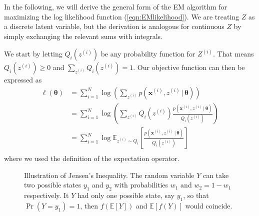 \documentclass[final,3p,times,twocolumn]{elsarticle}
\let\bs\boldsymbol
\begin{document}
In the following, we will derive the general form of the EM algorithm for maximizing the log likelihood function (\ref{eqn:EMlikelihood}).
We are treating $Z$ as a discrete latent variable, but the derivation is analogous for continuous $Z$ by simply exchanging the relevant sums with integrals.

We start by letting $Q_i(z^{(i)})$ be any probability function for $Z^{(i)}$. 
That means $Q_i(z^{(i)}) \geq 0$ and $\sum_{z^{(i)}} Q_i(z^{(i)}) = 1$. 
Our objective function can then be expressed as
\begin{equation}
\begin{split}
\ell(\bs\theta) &= \sum_{i=1}^N \log\left(\sum_{z^{(i)}} p(\bs x^{(i)},z^{(i)}\,|\,\bs\theta)\right)\\
&= \sum_{i=1}^N \log \left(\sum_{z^{(i)}} Q_i(z^{(i)}) \frac{p(\bs x^{(i)},z^{(i)}\,|\,\bs\theta)}{Q_i(z^{(i)})}\right)\\
&= \sum_{i=1}^N \log \mathbb{E}_{z^{(i)} \sim Q_i}\left[\frac{p(\bs x^{(i)},z^{(i)}\,|\,\bs\theta)}{Q_i(z^{(i)})}\right]\\
\end{split}
\end{equation}
where we used the definition of the expectation operator.

\begin{figure}
\caption{Illustration of Jensen's Inequality.
The random variable $Y$ can take two possible states $y_1$ and $y_2$ with probabilities $w_1$ and $w_2=1-w_1$ respectively.
It $Y$ had only one possible state, say $y_1$, so that $\Pr(Y=y_1)=1$, then $f\left(\mathbb{E}[Y]\right)$ and $\mathbb{E}\left[f(Y)\right]$ would coincide.
}
\label{fig:jensen}
\end{figure}
\end{document}
